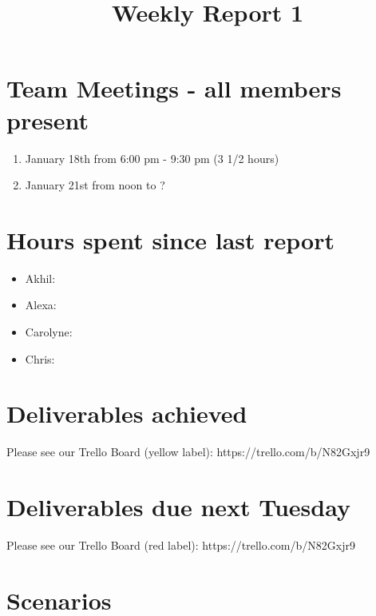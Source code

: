 \documentclass[a4paper,11pt]{article}
\begin{document}
\title{Weekly Report 1}
\maketitle

\section{Team Meetings - all members present}
\begin{enumerate}
\item January 18th from 6:00 pm - 9:30 pm (3 1/2 hours)
\item January 21st from noon to ?
\end{enumerate}

\section{Hours spent since last report}
\begin{itemize}
\item Akhil:
\item Alexa:
\item Carolyne: 
\item Chris:
\end{itemize}

\section{Deliverables achieved}
Please see our Trello Board (yellow label): https://trello.com/b/N82Gxjr9

\section{Deliverables due next Tuesday}
Please see our Trello Board (red label): https://trello.com/b/N82Gxjr9

\section{Scenarios}
\end{document}
